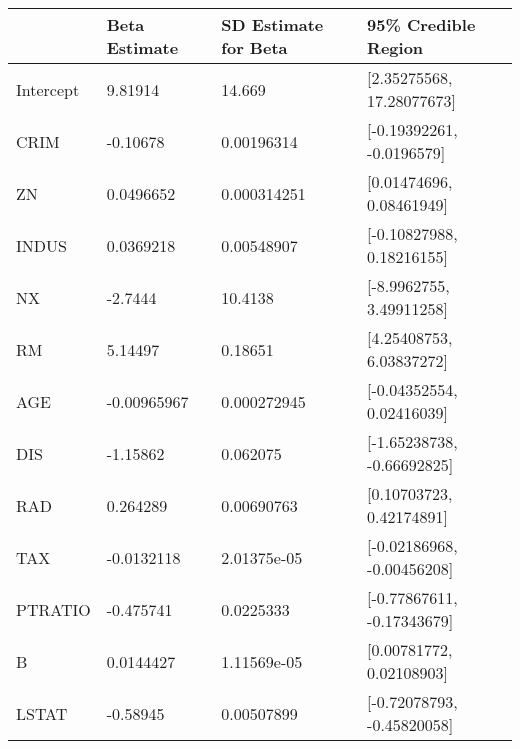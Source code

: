 \begin{tabular}{llll}
\hline
           & Beta Estimate   & SD Estimate for Beta   & 95\% Credible Region        \\
\hline
 Intercept & 9.81914         & 14.669                 & [2.35275568, 17.28077673]  \\
 CRIM      & -0.10678        & 0.00196314             & [-0.19392261, -0.0196579]  \\
 ZN        & 0.0496652       & 0.000314251            & [0.01474696, 0.08461949]   \\
 INDUS     & 0.0369218       & 0.00548907             & [-0.10827988, 0.18216155]  \\
 NX        & -2.7444         & 10.4138                & [-8.9962755, 3.49911258]   \\
 RM        & 5.14497         & 0.18651                & [4.25408753, 6.03837272]   \\
 AGE       & -0.00965967     & 0.000272945            & [-0.04352554, 0.02416039]  \\
 DIS       & -1.15862        & 0.062075               & [-1.65238738, -0.66692825] \\
 RAD       & 0.264289        & 0.00690763             & [0.10703723, 0.42174891]   \\
 TAX       & -0.0132118      & 2.01375e-05            & [-0.02186968, -0.00456208] \\
 PTRATIO   & -0.475741       & 0.0225333              & [-0.77867611, -0.17343679] \\
 B         & 0.0144427       & 1.11569e-05            & [0.00781772, 0.02108903]   \\
 LSTAT     & -0.58945        & 0.00507899             & [-0.72078793, -0.45820058] \\
\hline
\end{tabular}